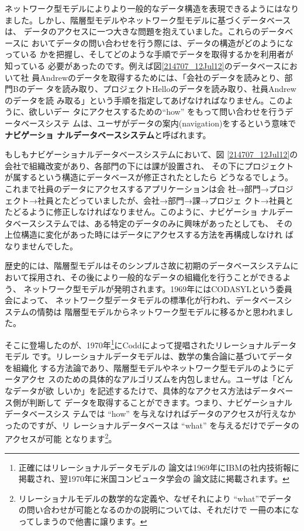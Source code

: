 ネットワーク型モデルによりより一般的なデータ構造を表現できるようにはなり
ました。しかし、階層型モデルやネットワーク型モデルに基づくデータベースは、
データのアクセスに一つ大きな問題を抱えていました。これらのデータベースに
おいてデータの問い合わせを行う際には、データの構造がどのようになっている
かを把握し、そしてどのような手順でデータを取得するかを利用者が知っている
必要があったのです。例えば図\ref{214707_12Jul12}のデータベースにおいて社
員Andrewのデータを取得するためには、「会社のデータを読みとり、部門Bのデー
タを読み取り、プロジェクトHelloのデータを読み取り、社員Andrewのデータを読
み取る」という手順を指定してあげなければなりません。このように、欲しいデー
タにアクセスするための``how'' をもって問い合わせを行うデータベースシステ
ムは、ユーザがデータの案内(navigation)をするという意味で{\bf ナビゲーショ
ナルデータベースシステム}と呼ばれます。

もしもナビゲーショナルデータベースシステムにおいて、図
\ref{214707_12Jul12}の会社で組織改変があり、各部門の下には課が設置され、
その下にプロジェクトが属するという構造にデータベースが修正されたとしたら
どうなるでしょう。これまで社員のデータにアクセスするアプリケーションは会
社→部門→プロジェクト→社員とたどっていましたが、会社→部門→課→プロジェ
クト→社員とたどるように修正しなければなりません。このように、ナビゲーショ
ナルデータベースシステムでは、ある特定のデータのみに興味があったとしても、
その上位構造に変化があった時にはデータにアクセスする方法を再構成しなけれ
ばなりませんでした。

歴史的には、階層型モデルはそのシンプルさ故に初期のデータベースシステムに
おいて採用され、その後により一般的なデータの組織化を行うことができるよう、
ネットワーク型モデルが発明されます。1969年にはCODASYLという委員会によって、
ネットワーク型データモデルの標準化が行われ、データベースシステムの情勢は
階層型モデルからネットワーク型モデルに移るかと思われました。

そこに登場したのが、1970年\footnote{正確にはリレーショナルデータモデルの
論文は1969年にIBMの社内技術報に掲載され、翌1970年に米国コンピュータ学会の
論文誌に掲載されます。}にCoddによって提唱されたリレーショナルデータモデル
です。リレーショナルデータモデルは、数学の集合論に基づいてデータを組織化
する方法論であり、階層型モデルやネットワーク型モデルのようにデータアクセ
スのための具体的なアルゴリズムを内包しません。ユーザは「どんなデータが欲
しいか」を記述するたけで、具体的なアクセス方法はデータベース側が判断して
データを取得することができます。つまり、ナビゲーショナルデータベースシス
テムでは ``how'' を与えなければデータのアクセスが行えなかったのですが、リ
レーショナルデータベースは ``what'' を与えるだけでデータのアクセスが可能
となります\footnote{リレーショナルモデルの数学的な定義や、なぜそれにより
``what''でデータの問い合わせが可能となるのかの説明については、それだけで
一冊の本になってしまうので他書に譲ります。}。

